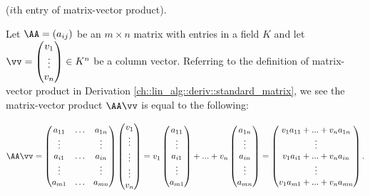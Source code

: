 \begin{theorem}
\label{ch::lin_alg::thm::coordinates_of_matrix_vector_product}
    ($i$th entry of matrix-vector product).
    
        Let $\AA = (a_{ij})$ be an $m \times n$ matrix with entries in a field $K$ and let $\vv = \begin{pmatrix} v_1 \\ \vdots \\ v_n \end{pmatrix} \in K^n$ be a column vector. Referring to the definition of matrix-vector product in Derivation \ref{ch::lin_alg::deriv::standard_matrix}, we see the matrix-vector product $\AA \vv$ is equal to the following:
    
    \begin{align*}
            \AA \vv = 
            \begin{pmatrix}
                a_{11} & \hdots & a_{1n} \\
                \vdots & & \vdots \\
                a_{i1} & \hdots & a_{in} \\
                \vdots & & \vdots \\
                a_{m1} & \hdots & a_{mn}
            \end{pmatrix}
            \begin{pmatrix} v_1 \\ \vdots \\ \vdots \\ \vdots \\ v_n \end{pmatrix}
            =
            v_1
            \begin{pmatrix} a_{11} \\ \vdots \\ a_{i1} \\ \vdots \\ a_{m1} \end{pmatrix}
            +
            ...
            +
            v_n
            \begin{pmatrix} a_{1n} \\ \vdots \\ a_{in} \\ \vdots \\ a_{mn} \end{pmatrix}
            =
            \begin{pmatrix} v_1 a_{11} + ... + v_n a_{1n} \\ \vdots \\ v_1 a_{i1} + ... + v_n a_{in} \\ \vdots \\ v_1 a_{m1} + ... + v_n a_{mn} \end{pmatrix}.
    \end{align*}


\end{theorem}
